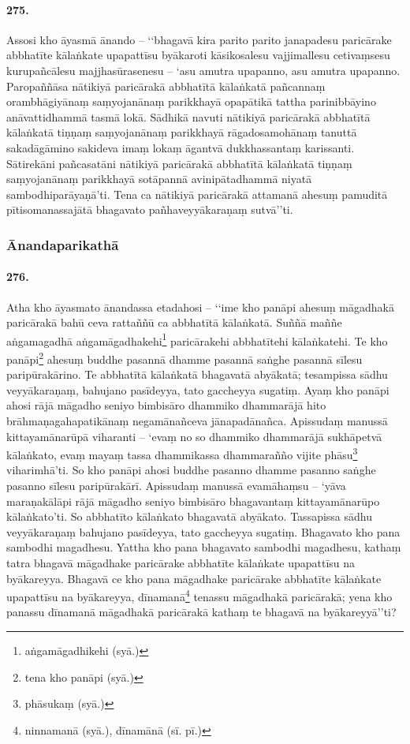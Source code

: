 \paragraph{275.} Assosi kho āyasmā ānando – ‘‘bhagavā kira parito parito janapadesu paricārake abbhatīte kālaṅkate upapattīsu byākaroti kāsikosalesu vajjimallesu cetivaṃsesu kurupañcālesu majjhasūrasenesu – ‘asu amutra upapanno, asu amutra upapanno. Paropaññāsa nātikiyā paricārakā abbhatītā kālaṅkatā pañcannaṃ orambhāgiyānaṃ saṃyojanānaṃ parikkhayā opapātikā tattha parinibbāyino anāvattidhammā tasmā lokā. Sādhikā navuti nātikiyā paricārakā abbhatītā kālaṅkatā tiṇṇaṃ saṃyojanānaṃ parikkhayā rāgadosamohānaṃ tanuttā sakadāgāmino sakideva imaṃ lokaṃ āgantvā dukkhassantaṃ karissanti. Sātirekāni pañcasatāni nātikiyā paricārakā abbhatītā kālaṅkatā tiṇṇaṃ saṃyojanānaṃ parikkhayā sotāpannā avinipātadhammā niyatā sambodhiparāyaṇā’ti. Tena ca nātikiyā paricārakā attamanā ahesuṃ pamuditā pītisomanassajātā bhagavato pañhaveyyākaraṇaṃ sutvā’’ti.

\subsubsection{Ānandaparikathā}

\paragraph{276.} Atha kho āyasmato ānandassa etadahosi – ‘‘ime kho panāpi ahesuṃ māgadhakā paricārakā bahū ceva rattaññū ca abbhatītā kālaṅkatā. Suññā maññe aṅgamagadhā aṅgamāgadhakehi\footnote{aṅgamāgadhikehi (syā.)} paricārakehi abbhatītehi kālaṅkatehi. Te kho panāpi\footnote{tena kho panāpi (syā.)} ahesuṃ buddhe pasannā dhamme pasannā saṅghe pasannā sīlesu paripūrakārino. Te abbhatītā kālaṅkatā bhagavatā abyākatā; tesampissa sādhu veyyākaraṇaṃ, bahujano pasīdeyya, tato gaccheyya sugatiṃ. Ayaṃ kho panāpi ahosi rājā māgadho seniyo bimbisāro dhammiko dhammarājā hito brāhmaṇagahapatikānaṃ negamānañceva jānapadānañca. Apissudaṃ manussā kittayamānarūpā viharanti – ‘evaṃ no so dhammiko dhammarājā sukhāpetvā kālaṅkato, evaṃ mayaṃ tassa dhammikassa dhammarañño vijite phāsu\footnote{phāsukaṃ (syā.)} viharimhā’ti. So kho panāpi ahosi buddhe pasanno dhamme pasanno saṅghe pasanno sīlesu paripūrakārī. Apissudaṃ manussā evamāhaṃsu – ‘yāva maraṇakālāpi rājā māgadho seniyo bimbisāro bhagavantaṃ kittayamānarūpo kālaṅkato’ti. So abbhatīto kālaṅkato bhagavatā abyākato. Tassapissa sādhu veyyākaraṇaṃ bahujano pasīdeyya, tato gaccheyya sugatiṃ. Bhagavato kho pana sambodhi magadhesu. Yattha kho pana bhagavato sambodhi magadhesu, kathaṃ tatra bhagavā māgadhake paricārake abbhatīte kālaṅkate upapattīsu na byākareyya. Bhagavā ce kho pana māgadhake paricārake abbhatīte kālaṅkate upapattīsu na byākareyya, dīnamanā\footnote{ninnamanā (syā.), dīnamānā (sī. pī.)} tenassu māgadhakā paricārakā; yena kho panassu dīnamanā māgadhakā paricārakā kathaṃ te bhagavā na byākareyyā’’ti?


